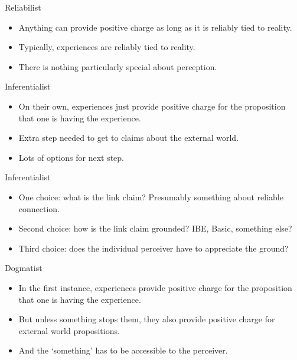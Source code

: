 \documentclass[
  17pt,
  letterpaper,
  ignorenonframetext,
  aspectratio=169,
  handout,
  xcolor={dvipsnames}]{beamer}
\providecommand{\tightlist}{%
  \setlength{\itemsep}{0pt}\setlength{\parskip}{0pt}}\usepackage{longtable,booktabs,array}
\begin{document}
\begin{frame}{Reliabilist}
\protect\hypertarget{reliabilist}{}
\begin{itemize}[<+->]
\tightlist
\item
  Anything can provide positive charge as long as it is reliably tied to
  reality.
\item
  Typically, experiences are reliably tied to reality.
\item
  There is nothing particularly special about perception.
\end{itemize}
\end{frame}

\begin{frame}{Inferentialist}
\protect\hypertarget{inferentialist}{}
\begin{itemize}[<+->]
\tightlist
\item
  On their own, experiences just provide positive charge for the
  proposition that one is having the experience.
\item
  Extra step needed to get to claims about the external world.
\item
  Lots of options for next step.
\end{itemize}
\end{frame}

\begin{frame}{Inferentialist}
\protect\hypertarget{inferentialist-1}{}
\begin{itemize}[<+->]
\tightlist
\item
  One choice: what is the link claim? Presumably something about
  reliable connection.
\item
  Second choice: how is the link claim grounded? IBE, Basic, something
  else?
\item
  Third choice: does the individual perceiver have to appreciate the
  ground?
\end{itemize}
\end{frame}

\begin{frame}{Dogmatist}
\protect\hypertarget{dogmatist}{}
\begin{itemize}[<+->]
\tightlist
\item
  In the first instance, experiences provide positive charge for the
  proposition that one is having the experience.
\item
  But unless something stops them, they also provide positive charge for
  external world propositions.
\item
  And the `something' has to be accessible to the perceiver.
\end{itemize}
\end{frame}
\end{document}
